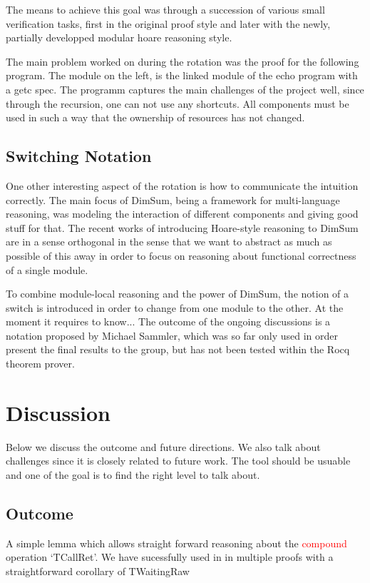 \documentclass[runningheads, orivec]{llncs}
\begin{document}
The means to achieve this goal was through a succession of various small verification tasks, first in the original proof style and later with the newly, partially developped modular hoare reasoning style.

The main problem worked on during the rotation was the proof for the following program. The module on the left, is the linked module of the echo program with a getc spec.
The programm captures the main challenges of the project well, since through the recursion, one can not use any shortcuts. All components must be used in such a way that the ownership of resources has not changed.

\subsection{Switching Notation}
One other interesting aspect of the rotation is how to communicate the intuition correctly. The main focus of DimSum, being a framework for multi-language reasoning, was modeling the interaction of different components and giving good stuff for that.
The recent works of introducing Hoare-style reasoning to DimSum are in a sense orthogonal in the sense that we want to abstract as much as possible of this away in order to focus on reasoning about functional correctness of a single module.

To combine module-local reasoning and the power of DimSum, the notion of a switch is introduced in order to change from one module to the other. At the moment it requires to know...
The outcome of the ongoing discussions is a notation proposed by Michael Sammler, which was so far only used in order present the final results to the group, but has not been tested within the Rocq theorem prover.


\section{Discussion}

Below we discuss the outcome and future directions. We also talk about challenges since it is closely related to future work. The tool should be usuable and one of the goal is to find the right level to talk about.

\subsection{Outcome}

A simple lemma which allows straight forward reasoning about the \textcolor{red}{compound} operation `TCallRet'.
We have sucessfully used in in multiple proofs with a straightforward corollary of TWaitingRaw
\end{document}
